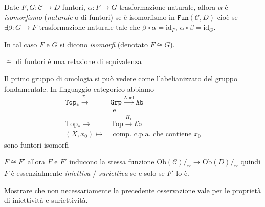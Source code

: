 \begin{definition}{}
    Date \(F, G : \mathcal{C} \to D\) funtori, \(\alpha : F \to G\) trasformazione
    naturale, allora \(\alpha\) è \emph{isomorfismo} (\emph{naturale} o di funtori) se è isomorfismo in \(\mathtt{Fun}{(\mathcal{C}, D)}\) cioè se 
    \(\exists \beta : G \to F\) trasformazione naturale tale che \(\beta \circ
    \alpha = \mathrm{id}_F\), \(\alpha \circ \beta = \mathrm{id}_G\).

    In tal caso \(F\) e \(G\) si dicono \emph{isomorfi} (denotato \(F \cong
    G\)).
\end{definition}
\begin{remark}{}
    \(\cong\) di funtori è una relazione di equivalenza 
\end{remark}
\begin{example}{}

Il primo gruppo di omologia si può vedere come l'abelianizzato del gruppo
fondamentale. In linguaggio categorico abbiamo 
\begin{align*}
  \mathtt{Top_*} \overset{\pi_{1}}{\to } &\mathtt{Grp} \overset{\mathrm{Abel}}{\to } \mathtt{Ab} \\ 
  &\text{ e } \\
  \mathrm{Top_*} \to &\mathrm{Top} \overset{H_{1}}{\to } \mathtt{Ab} \\
  {(X, x_{0})} \mapsto &\text{ comp. c.p.a. che contiene \(x_{0}\)}
\end{align*}
sono funtori isomorfi
\end{example}

\begin{remark}{}
    \(F \cong F'\) allora \(F\) e \(F'\) inducono la stessa funzione \(\mathrm{Ob}{(\mathcal{C})} /_{\cong} \to \mathrm{Ob}{(D)}/_{\cong}\) quindi \(F\) è essenzialmente 
   \emph{iniettiva} / \emph{suriettiva} se e solo se \(F'\) lo è.
\end{remark}

\begin{eser}{}
    Mostrare che non necessariamente la precedente osservazione vale per le
    proprietà di iniettività e suriettività.
\end{eser}

